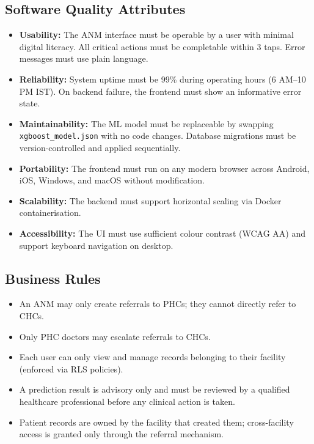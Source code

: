 \documentclass[12pt,a4paper]{article}
\begin{document}
\subsection{Software Quality Attributes}
\begin{itemize}
    \item \textbf{Usability:} The ANM interface must be operable by a user with minimal digital literacy. All critical actions must be completable within 3 taps. Error messages must use plain language.
    \item \textbf{Reliability:} System uptime must be 99\% during operating hours (6 AM--10 PM IST). On backend failure, the frontend must show an informative error state.
    \item \textbf{Maintainability:} The ML model must be replaceable by swapping \texttt{xgboost\_model.json} with no code changes. Database migrations must be version-controlled and applied sequentially.
    \item \textbf{Portability:} The frontend must run on any modern browser across Android, iOS, Windows, and macOS without modification.
    \item \textbf{Scalability:} The backend must support horizontal scaling via Docker containerisation.
    \item \textbf{Accessibility:} The UI must use sufficient colour contrast (WCAG AA) and support keyboard navigation on desktop.
\end{itemize}

\subsection{Business Rules}
\begin{itemize}
    \item An ANM may only create referrals to PHCs; they cannot directly refer to CHCs.
    \item Only PHC doctors may escalate referrals to CHCs.
    \item Each user can only view and manage records belonging to their facility (enforced via RLS policies).
    \item A prediction result is advisory only and must be reviewed by a qualified healthcare professional before any clinical action is taken.
    \item Patient records are owned by the facility that created them; cross-facility access is granted only through the referral mechanism.
\end{itemize}
\end{document}
